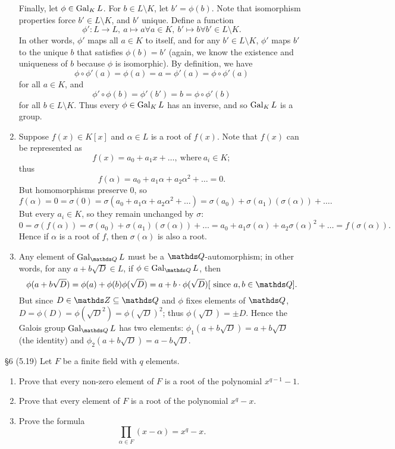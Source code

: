 \documentclass{homework}
\begin{document}
\begin{solution}
\begin{enumerate}[label=(\alph*)]
      Finally, let $\phi\in \operatorname{Gal}_KL$. For $b\in L\setminus K$, let $b'=\phi(b)$. Note that
      isomorphism properties force $b'\in L\setminus K$, and $b'$ unique. Define a function \[
        \phi':L\to L,\ a\mapsto a \forall a\in K,\ b'\mapsto b \forall b'\in L\setminus K
      .\] In other words, $\phi'$ maps all $a\in K$ to itself, and for any $b'\in L\setminus K$,
      $\phi'$ maps $b'$ to the unique $b$ that satisfies $\phi(b)=b'$ (again, we know the existence
      and uniqueness of $b$ because $\phi$ is isomorphic). By definition, we have \[
        \phi\circ \phi'(a)=\phi(a)=a=\phi'(a)=\phi\circ \phi'(a)
      \] for all $a\in K$, and \[
      \phi'\circ \phi(b)=\phi'(b')=b=\phi\circ \phi'(b)
      \] for all $b\in L\setminus K$. Thus every $\phi\in \operatorname{Gal}_KL$ has an inverse, and so $\operatorname{Gal}_KL$
      is a group.
    \item Suppose $f(x)\in K[x]$ and $\alpha\in L$ is a root of $f(x)$. Note that $f(x)$ can be
      represented as \[
        f(x)=a_0+a_1x+\ldots,~\text{where}~a_i\in K
      ;\] thus \[
        f(\alpha)=a_0+a_1\alpha+a_2\alpha^2+\ldots=0
      .\] But homomorphisms preserve $0$, so \[
      f(\alpha)=0=\sigma(0)=\sigma(a_0+a_1\alpha+a_2\alpha^2+\ldots)=\sigma(a_0)+\sigma(a_1)(\sigma(\alpha))+\ldots
      .\] But every $a_i\in K$, so they remain unchanged by $\sigma$: \[
        0=\sigma(f(\alpha))=\sigma(a_0)+\sigma(a_1)(\sigma(\alpha))+\ldots=a_0+a_1\sigma(\alpha)+a_2\sigma(\alpha)^2+\ldots=f(\sigma(\alpha)) 
      .\] Hence if $\alpha$ is a root of $f$, then $\sigma(\alpha)$ is also a root.
    \item Any element of $\Gal_{\Q}L$ must be a $\Q$-automorphism; in other words, for any
      $a+b\sqrt{D}\in L$, if $\phi\in \Gal_{\Q}L$, then \[
        \phi(a+b\sqrt{D})=\phi(a)+\phi(b)\phi(\sqrt{D})=a+b\cdot \phi(\sqrt{D}) [~\text{since}~
        a,b\in \Q]
      .\] But since $D\in \Z\subseteq \Q$ and $\phi$ fixes elements of $\Q$,
      $D=\phi(D)=\phi(\sqrt{D}^2)=\phi(\sqrt{D})^2$; thus $\phi(\sqrt{D})=\pm D$. Hence the Galois
      group $\Gal_{\Q}L$ has two elements: $\phi_1(a+b\sqrt{D})=a+b\sqrt{D}$ (the identity) and
      $\phi_2(a+b\sqrt{D})=a-b\sqrt{D}$.
  \end{enumerate}
\end{solution}

\begin{problem}{\S 6}
  (5.19) Let $F$ be a finite field with $q$ elements.
  \begin{enumerate}[label=(\alph*)]
    \item Prove that every non-zero element of $F$ is a root of the polynomial $x^{q-1}-1$.
    \item Prove that every element of $F$ is a root of the polynomial $x^q-x$.
    \item Prove the formula \[
        \prod_{\alpha\in F}(x-\alpha)=x^q-x  
    .\] 
  \end{enumerate}
\end{problem}
\end{document}
